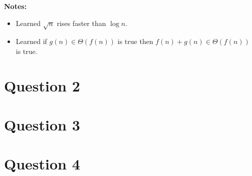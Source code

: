 \documentclass[12pt]{article}
\begin{document}
\begin{enumerate}[a.]
    \bigskip

    \textbf{Notes:}

    \begin{itemize}
        \item Learned $\sqrt{n}$ rises faster than $\log n$.
        \item Learned if $g(n) \in \Theta(f(n))$ is true then
        $f(n) + g(n) \in \Theta(f(n))$ is true.
    \end{itemize}



\end{enumerate}

\section*{Question 2}

\section*{Question 3}

\section*{Question 4}
\end{document}
